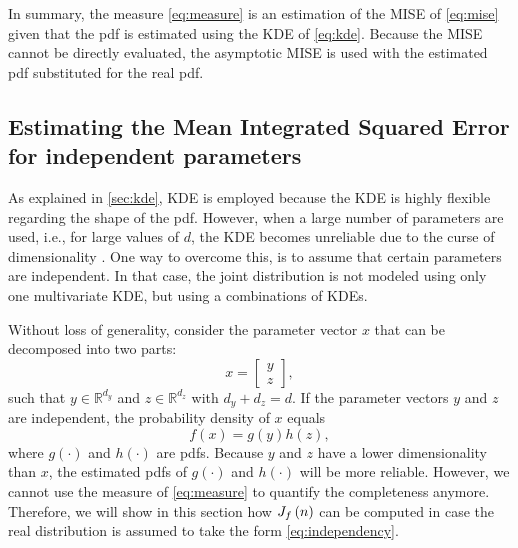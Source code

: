 \cstart
In summary, the measure \cref{eq:measure} is an estimation of the MISE of \eqref{eq:mise} given that the pdf is estimated using the KDE of \eqref{eq:kde}. Because the MISE cannot be directly evaluated, the asymptotic MISE is used with the estimated pdf substituted for the real pdf. 
\cend

\subsection{Estimating the Mean Integrated Squared Error for independent parameters}
\label{sec:mise independent}

As explained in \cref{sec:kde}, KDE is employed because the KDE is highly flexible regarding the shape of the pdf. However, when a large number of parameters are used, i.e., for large values of $d$, the KDE becomes unreliable due to the curse of dimensionality \cite{scott2015multivariate}. One way to overcome this, is to assume that certain parameters are independent. 
\cstart
In that case, the joint distribution is not modeled using only one multivariate KDE, but using a combinations of KDEs.
\cend

Without loss of generality, consider the parameter vector $x$ that can be decomposed into two parts:
\begin{equation}
	\label{eq:combine}
	x = \begin{bmatrix}
		y \\ z
	\end{bmatrix},
\end{equation}
such that $y \in \mathbb{R}^{d_y}$ and $z \in \mathbb{R}^{d_z}$ with $d_y+d_z=d$. If the parameter vectors $y$ and $z$ are independent, the probability density of $x$ equals
\begin{equation}
	\label{eq:independency}
	f(x) = g(y) h(z),
\end{equation}
where $g(\cdot)$ and $h(\cdot)$ are pdfs.
Because $y$ and $z$ have a lower dimensionality than $x$, the estimated pdfs of $g(\cdot)$ and $h(\cdot)$ will be more reliable. However, we cannot use the measure of \cref{eq:measure} to quantify the completeness anymore. Therefore, we will show in this section how $J_{f} \left( n \right)$ can be computed in case the real distribution is assumed to take the form \cref{eq:independency}.

